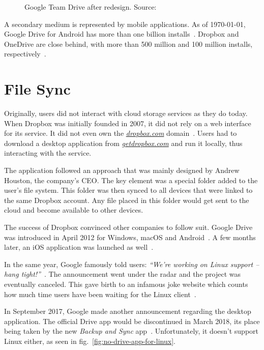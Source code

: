 \begin{figure}[bpt]
\caption{Google Team Drive after redesign. Source:~\cite{google_drive_ui_updates}}
\label{fig:drive-after}
\centering
{}
\end{figure}


A secondary medium is represented by mobile applications. As of \monthyeardate\today, Google Drive for Android has more than one billion installs~\cite{google_drive_android_app}. Dropbox and OneDrive are close behind, with more than 500 million and 100 million installs, respectively~\cite{dropbox_android_app,one_drive_android_app}.

\section{File Sync}

Originally, users did not interact with cloud storage services as they do today. When Dropbox was initially founded in 2007, it did not rely on a web interface for its service. It did not even own the \emph{\url{dropbox.com}} domain~\cite{dropbox_acquires_dropbox_dot_com}. Users had to download a desktop application from \emph{\url{getdropbox.com}} and run it locally, thus interacting with the service.

The application followed an approach that was mainly designed by Andrew Houston, the company's CEO. The key element was a special folder added to the user's file system. This folder was then synced to all devices that were linked to the same Dropbox account. Any file placed in this folder would get sent to the cloud and become available to other devices.

The success of Dropbox convinced other companies to follow suit. Google Drive was introduced in April 2012 for Windows, macOS and Android~\cite{introducing_google_drive}. A few months later, an iOS application was launched as well~\cite{hands_on_with_the_google_drive_for_ios_app}.

In the same year, Google famously told users: \emph{``We're working on Linux support -- hang tight!''}~\cite{google_drive_for_linux_is_on_the_way}. The announcement went under the radar and the project was eventually canceled. This gave birth to an infamous joke website which counts how much time users have been waiting for the Linux client~\cite{how_long_since_google_said_hang_tight}.

In September 2017, Google made another announcement regarding the desktop application. The official Drive app would be discontinued in March 2018, its place being taken by the new \emph{Backup and Sync} app~\cite{introducing_backup_and_sync,google_drive_is_being_replaced_by_backup_and_sync}. Unfortunately, it doesn't support Linux either, as seen in fig.~\ref{fig:no-drive-app-for-linux}.

